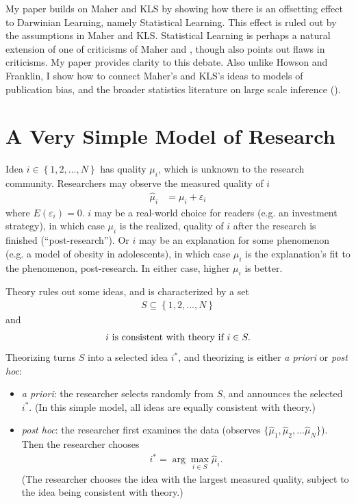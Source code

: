 \documentclass[12pt,english]{article}
\theoremstyle{plain}
\theoremstyle{plain}
\begin{document}
My paper builds on Maher and KLS by showing how there is an offsetting effect to Darwinian Learning, namely Statistical Learning. This effect is ruled out by the assumptions in Maher and KLS. Statistical Learning is perhaps a natural extension of one of  criticisms of Maher \citeyearpar{maher1988prediction} and \citeyearpar{maher1990prediction}, though \citet{maher1993discussion} also points out flaws in  criticisms.  My paper provides clarity to this debate. Also unlike Howson and Franklin, I show how to connect Maher's and KLS's ideas to models of publication bias, and the broader statistics literature on large scale inference  (\citet{efron2012large}).

\section{A Very Simple Model of Research}\label{sec:ez}

Idea $i \in \left\{ 1,2,...,N\right\} $ has quality $\mu_{i}$, which is unknown to the research community. Researchers may observe the measured quality of $i$ 
\begin{align}
\hat{\mu}_{i} &= \mu_{i} + \varepsilon_{i}
\label{eq:ez:muhat}
\end{align}
where $E\left(\varepsilon_{i}\right) = 0$. $i$ may be a real-world choice for readers (e.g. an investment strategy), in which case $\mu_{i}$ is the realized, quality of $i$ after the research is finished (``post-research''). Or $i$ may be an explanation for some phenomenon (e.g. a model of obesity in adolescents), in which case $\mu_{i}$ is the explanation's fit to the phenomenon, post-research. In either case, higher $\mu_{i}$ is better.

Theory rules out some ideas, and is characterized by a set 
\begin{align}
    S \subseteq \left\{ 1,2,...,N\right\}
    \label{eq:ez:S}
\end{align}
and 
\begin{align}
\text{\ensuremath{i} is consistent with theory if }i\in S .
\end{align}
Theorizing turns $S$ into a selected idea $i^\ast$, and theorizing is either \emph{a priori} or \emph{post hoc}: 
\begin{itemize}
\item \emph{a priori}: the researcher selects randomly from $S$, and announces the selected $i^\ast$. (In this simple model, all ideas are equally consistent with theory.)
\item \emph{post hoc}: the researcher first examines the data (observes $\{\hat{\mu}_1,\hat{\mu}_2,...\hat{\mu}_N\}$). Then the researcher chooses 
\begin{align}
    i^\ast =  \arg\max_{i\in S }\hat{\mu}_{i}.\label{eq:given-ihat}
\end{align}
(The researcher chooses the idea with the largest measured quality, subject to the idea being consistent with theory.)
\end{itemize}
\end{document}
